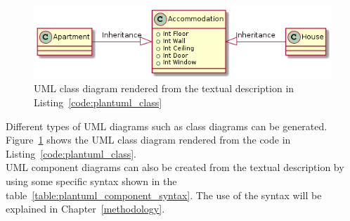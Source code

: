 \begin{figure}[H]
\centering
\captionsetup{justification=centering}
\vspace{0cm}%
\includegraphics[width=0.8\linewidth]{figure/misc/plantuml_class.png}
\caption{UML class diagram rendered from the textual description in Listing~\ref{code:plantuml_class}}
\label{fig:plantuml_class}
\end{figure}

Different types of UML diagrams such as class diagrams can be generated. Figure~\ref{fig:plantuml_class} shows the UML class diagram rendered from the code in Listing~\ref{code:plantuml_class}.\\

UML component diagrams can also be created from the textual description by using some specific syntax shown in the table~\ref{table:plantuml_component_syntax}. The use of the syntax will be explained in Chapter~\ref{methodology}. 

